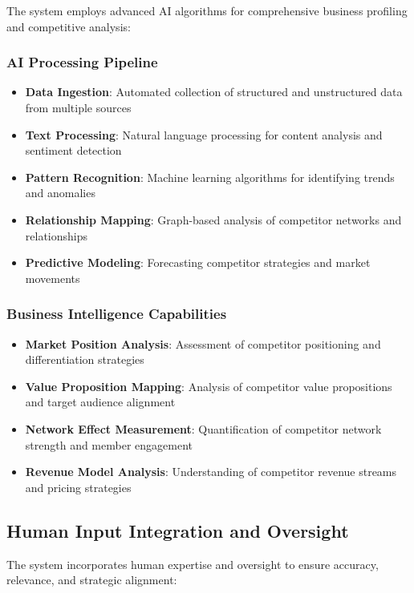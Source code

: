 The system employs advanced AI algorithms for comprehensive business profiling and competitive analysis:

\subsubsection{AI Processing Pipeline}
\begin{itemize}
    \item \textbf{Data Ingestion}: Automated collection of structured and unstructured data from multiple sources
    \item \textbf{Text Processing}: Natural language processing for content analysis and sentiment detection
    \item \textbf{Pattern Recognition}: Machine learning algorithms for identifying trends and anomalies
    \item \textbf{Relationship Mapping}: Graph-based analysis of competitor networks and relationships
    \item \textbf{Predictive Modeling}: Forecasting competitor strategies and market movements
\end{itemize}

\subsubsection{Business Intelligence Capabilities}
\begin{itemize}
    \item \textbf{Market Position Analysis}: Assessment of competitor positioning and differentiation strategies
    \item \textbf{Value Proposition Mapping}: Analysis of competitor value propositions and target audience alignment
    \item \textbf{Network Effect Measurement}: Quantification of competitor network strength and member engagement
    \item \textbf{Revenue Model Analysis}: Understanding of competitor revenue streams and pricing strategies
\end{itemize}

\subsection{Human Input Integration and Oversight}

The system incorporates human expertise and oversight to ensure accuracy, relevance, and strategic alignment:

